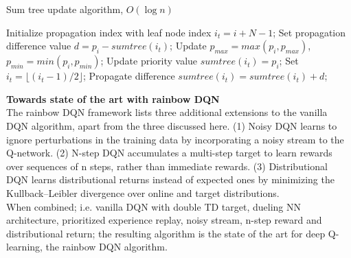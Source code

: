 \begin{algorithm}[H]
\small
\caption*{Sum tree update algorithm, $O(\log n)$}
\begin{algorithmic}
    \STATE Initialize propagation index with leaf node index $i_t = i+N-1$;
    \STATE Set propagation difference value $d = p_i - sumtree(i_t)$;
    \STATE Update $p_{max} = max(p_i,p_{max})$, $p_{min} = min(p_i,p_{min})$;
    \STATE Update priority value $sumtree(i_t) = p_i$;
        \bindent
        \STATE Set $i_t = \lfloor(i_t - 1) / 2\rfloor$;
        \STATE Propagate difference $sumtree(i_t) = sumtree(i_t) + d$;
        \eindent
    \ENDWHILE
\end{algorithmic}
\end{algorithm}

\textbf{Towards state of the art with rainbow DQN} \\
The rainbow DQN framework lists three additional extensions to the vanilla DQN algorithm, apart from the three discussed here. (1) Noisy DQN learns to ignore perturbations in the training data by incorporating a noisy stream to the Q-network. (2) N-step DQN accumulates a multi-step target to learn rewards over sequences of n steps, rather than immediate rewards. (3) Distributional DQN learns distributional returns instead of expected ones by minimizing the Kullback–Leibler divergence over online and target distributions. \\
When combined; i.e. vanilla DQN with double TD target, dueling NN architecture, prioritized experience replay, noisy stream, n-step reward and distributional return; the resulting algorithm is the state of the art for deep Q-learning, the rainbow DQN algorithm. 

\pagebreak